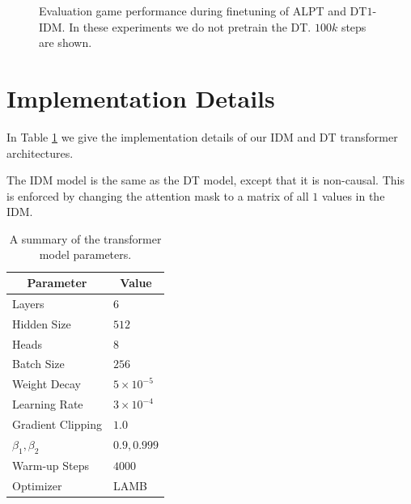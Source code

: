 \documentclass{article} %
\begin{document}
\begin{figure}[H]
    \caption{Evaluation game performance during finetuning of ALPT and DT$1$-IDM.  In these experiments we do not pretrain the DT. $100k$ steps are shown.}
    \label{fig:nodt}
\end{figure}


\section{Implementation Details}
In Table \ref{tab:params} we give the implementation details of our IDM and DT transformer architectures.

The IDM model is the same as the DT model, except that it is non-causal.  This is enforced by changing the attention mask to a matrix of all $1$ values in the IDM.

\begin{table}[H]
\caption{A summary of the transformer model parameters.}
\label{tab:params}
\begin{center}
\begin{tabular}{ll}
\multicolumn{1}{c}{\bf Parameter} & 
\multicolumn{1}{c}{\bf Value} 
\\ \hline
{Layers} & $6$
\\
{Hidden Size} & $512$
\\
{Heads} & $8$ 
\\
{Batch Size} & $256$
\\
{Weight Decay} & $5 \times 10^{-5}$ 
\\
{Learning Rate} & $3 \times 10^{-4}$ 
\\
{Gradient Clipping} & $1.0$ 
\\
{$\beta_1, \beta_2$} & $0.9, 0.999$ 
\\
{Warm-up Steps} & $4000$ 
\\
{Optimizer} & LAMB 
\end{tabular}
\end{center}
\end{table}
\end{document}
